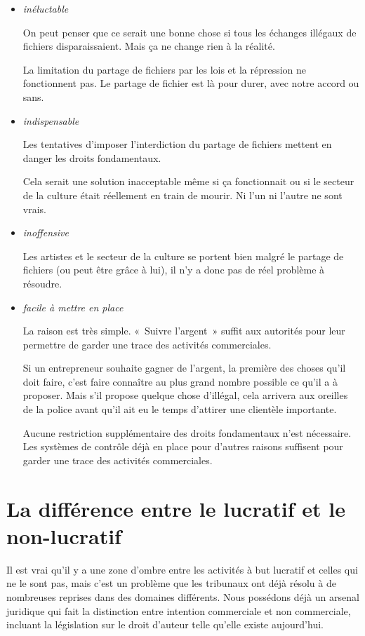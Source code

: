 \begin{itemize}
 \item \emph{inéluctable}
 
On peut penser que ce serait une bonne chose si tous les échanges illégaux de fichiers
disparaissaient. Mais ça
ne change rien à la réalité. 

La limitation du partage de fichiers par les lois et la répression ne
fonctionnent pas. Le partage de fichier est là pour durer, avec notre accord ou sans.
\item \emph{indispensable}

Les tentatives d’imposer
l’interdiction du partage de fichiers mettent en danger les droits fondamentaux.

Cela serait une solution inacceptable même si ça fonctionnait ou si le secteur de la culture était réellement en train de mourir. Ni l'un ni l'autre ne sont vrais.
\item \emph{inoffensive}

Les artistes et le secteur de la
culture se portent bien malgré le partage de fichiers (ou peut être grâce à
lui), il n’y a donc pas de réel problème à résoudre.

\item \emph{facile à mettre en place}

La raison est très simple. «~Suivre l’argent~» suffit aux autorités pour leur permettre de garder une trace des activités
commerciales.

Si un entrepreneur souhaite gagner de l’argent, la première des choses qu’il doit faire, c’est faire connaître au plus grand nombre possible ce qu’il a à proposer. Mais s'il propose quelque
chose d’illégal, cela arrivera aux oreilles de la police avant qu’il ait eu le temps d’attirer une
clientèle importante.

Aucune restriction supplémentaire des droits fondamentaux n’est nécessaire. Les systèmes de contrôle
déjà en place pour d’autres raisons suffisent pour garder une trace des activités commerciales.

\end{itemize}

\section{La différence entre le lucratif et le non-lucratif}
Il est vrai qu’il y a une zone d’ombre entre les activités à but lucratif et celles qui ne le sont pas, mais
c’est un problème que les tribunaux ont déjà résolu à de nombreuses reprises dans des domaines
différents. Nous possédons déjà un arsenal juridique qui fait la distinction entre intention commerciale et non
commerciale, incluant la législation sur le droit d’auteur telle qu’elle existe aujourd’hui.

